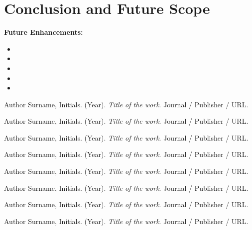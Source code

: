 \documentclass[12pt, a4paper, oneside]{report}
\begin{document}
\chapter{Conclusion and Future Scope}
\label{chap:conclusion}

\lipsum[77][1-5]

\noindent\textbf{Future Enhancements:}

\begin{itemize}
    \item \lipsum[78][1-1]
    \item \lipsum[79][1-1]
    \item \lipsum[80][1-1]
    \item \lipsum[81][1-1]
    \item \lipsum[82][1-1]
\end{itemize}

\lipsum[83][1-2]


\begin{thebibliography}{99}

Author Surname, Initials. (Year). \textit{Title of the work}.
Journal / Publisher / URL.

Author Surname, Initials. (Year). \textit{Title of the work}.
Journal / Publisher / URL.

Author Surname, Initials. (Year). \textit{Title of the work}.
Journal / Publisher / URL.

Author Surname, Initials. (Year). \textit{Title of the work}.
Journal / Publisher / URL.

Author Surname, Initials. (Year). \textit{Title of the work}.
Journal / Publisher / URL.

Author Surname, Initials. (Year). \textit{Title of the work}.
Journal / Publisher / URL.

Author Surname, Initials. (Year). \textit{Title of the work}.
Journal / Publisher / URL.

Author Surname, Initials. (Year). \textit{Title of the work}.
Journal / Publisher / URL.


\end{thebibliography}

%
% 
% 
\end{document}
